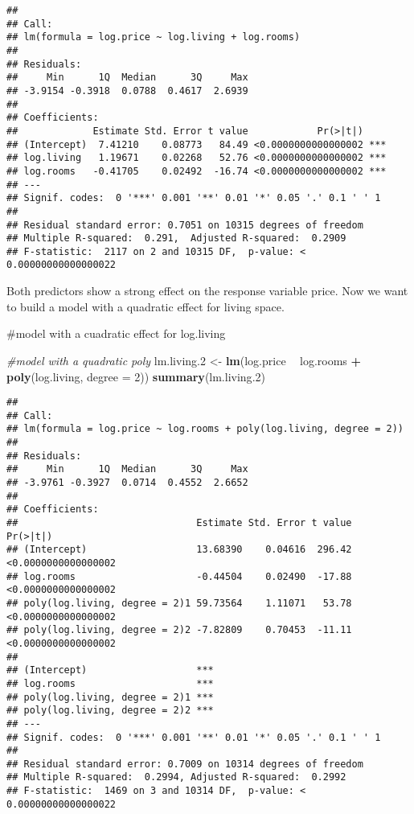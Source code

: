 \documentclass[
]{article}
\newenvironment{Shaded}{\begin{snugshade}}{\end{snugshade}}
\newcommand{\CommentTok}[1]{\textcolor[rgb]{0.56,0.35,0.01}{\textit{#1}}}
\newcommand{\DataTypeTok}[1]{\textcolor[rgb]{0.13,0.29,0.53}{#1}}
\newcommand{\DecValTok}[1]{\textcolor[rgb]{0.00,0.00,0.81}{#1}}
\newcommand{\FloatTok}[1]{\textcolor[rgb]{0.00,0.00,0.81}{#1}}
\newcommand{\KeywordTok}[1]{\textcolor[rgb]{0.13,0.29,0.53}{\textbf{#1}}}
\newcommand{\NormalTok}[1]{#1}
\newcommand{\OperatorTok}[1]{\textcolor[rgb]{0.81,0.36,0.00}{\textbf{#1}}}
\newcommand{\StringTok}[1]{\textcolor[rgb]{0.31,0.60,0.02}{#1}}
\begin{document}
\begin{verbatim}
## 
## Call:
## lm(formula = log.price ~ log.living + log.rooms)
## 
## Residuals:
##     Min      1Q  Median      3Q     Max 
## -3.9154 -0.3918  0.0788  0.4617  2.6939 
## 
## Coefficients:
##             Estimate Std. Error t value            Pr(>|t|)    
## (Intercept)  7.41210    0.08773   84.49 <0.0000000000000002 ***
## log.living   1.19671    0.02268   52.76 <0.0000000000000002 ***
## log.rooms   -0.41705    0.02492  -16.74 <0.0000000000000002 ***
## ---
## Signif. codes:  0 '***' 0.001 '**' 0.01 '*' 0.05 '.' 0.1 ' ' 1
## 
## Residual standard error: 0.7051 on 10315 degrees of freedom
## Multiple R-squared:  0.291,  Adjusted R-squared:  0.2909 
## F-statistic:  2117 on 2 and 10315 DF,  p-value: < 0.00000000000000022
\end{verbatim}

Both predictors show a strong effect on the response variable price. Now
we want to build a model with a quadratic effect for living space.

\#model with a cuadratic effect for log.living

\begin{Shaded}
\begin{Highlighting}[]
\CommentTok{#model with a quadratic poly}
\NormalTok{lm.living}\FloatTok{.2}\NormalTok{ <-}\StringTok{ }\KeywordTok{lm}\NormalTok{(log.price }\OperatorTok{~}\StringTok{ }\NormalTok{log.rooms }\OperatorTok{+}\StringTok{ }\KeywordTok{poly}\NormalTok{(log.living, }\DataTypeTok{degree =} \DecValTok{2}\NormalTok{))}
\KeywordTok{summary}\NormalTok{(lm.living}\FloatTok{.2}\NormalTok{)}
\end{Highlighting}
\end{Shaded}

\begin{verbatim}
## 
## Call:
## lm(formula = log.price ~ log.rooms + poly(log.living, degree = 2))
## 
## Residuals:
##     Min      1Q  Median      3Q     Max 
## -3.9761 -0.3927  0.0714  0.4552  2.6652 
## 
## Coefficients:
##                               Estimate Std. Error t value            Pr(>|t|)
## (Intercept)                   13.68390    0.04616  296.42 <0.0000000000000002
## log.rooms                     -0.44504    0.02490  -17.88 <0.0000000000000002
## poly(log.living, degree = 2)1 59.73564    1.11071   53.78 <0.0000000000000002
## poly(log.living, degree = 2)2 -7.82809    0.70453  -11.11 <0.0000000000000002
##                                  
## (Intercept)                   ***
## log.rooms                     ***
## poly(log.living, degree = 2)1 ***
## poly(log.living, degree = 2)2 ***
## ---
## Signif. codes:  0 '***' 0.001 '**' 0.01 '*' 0.05 '.' 0.1 ' ' 1
## 
## Residual standard error: 0.7009 on 10314 degrees of freedom
## Multiple R-squared:  0.2994, Adjusted R-squared:  0.2992 
## F-statistic:  1469 on 3 and 10314 DF,  p-value: < 0.00000000000000022
\end{verbatim}
\end{document}
